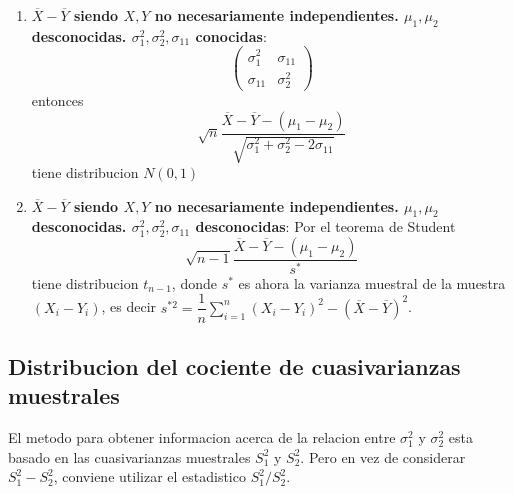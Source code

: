 \documentclass[10pt]{extarticle}
\newcommand{\<}{\langle}
\renewcommand{\>}{\rangle}
\theoremstyle{definition}
\begin{document}
\begin{enumerate}
        (Welch) Si los tamanos muestrales son muy pequenos $(n, m \leq 15)$:
        \begin{equation*}
          \dfrac{\overline{X}-\overline{Y} - (\mu_1-\mu_2)}{\sqrt{S_1^2/n + S_2^2/m}}
        \end{equation*}
        tiene aproximadamente distribucion $t_f$, siendo $f$ el numero de grados de libertad, esto es, el entero mas proximo a
        \begin{equation*}
          \dfrac{(S_1^2/n + S_2^2/m)^2}{\dfrac{1}{n+1} (S_1^2/n)^2 + \dfrac{1}{m+1}(S_2^2/m)^2} - 2
        \end{equation*}
  \item \textbf{$\overline{X}- \overline{Y}$ siendo $X, Y$ no necesariamente independientes. $\mu_1, \mu_2$ desconocidas. $\sigma_1^2, \sigma_2^2, \sigma_{11}$ conocidas}:
        \[    %
          \begin{pmatrix}
            \sigma_1^2  & \sigma_{11} \\
            \sigma_{11} & \sigma_2^2
          \end{pmatrix}
        \]    %
        entonces
        \begin{equation*}
          \sqrt{n} \dfrac{\overline{X}-\overline{Y} - (\mu_1-\mu_2)}{\sqrt{\sigma_1^2 + \sigma_2^2 - 2\sigma_{11}}}
        \end{equation*}
        tiene distribucion $N(0,1)$
  \item \textbf{$\overline{X}- \overline{Y}$ siendo $X, Y$ no necesariamente independientes. $\mu_1, \mu_2$ desconocidas. $\sigma_1^2, \sigma_2^2, \sigma_{11}$ desconocidas}:
        Por el teorema de Student
        \begin{equation*}
          \sqrt{n-1}\dfrac{\overline{X}-\overline{Y} - (\mu_1-\mu_2)}{s^*}
        \end{equation*}
        tiene distribucion $t_{n-1}$, donde $s^*$ es ahora la varianza muestral de la muestra $(X_i - Y_i)$, es decir $s^{*2}=\dfrac{1}{n}\sum_{i=1}^n(X_i-Y_i)^2 - (\overline{X} - \overline{Y})^2$.
\end{enumerate}

\subsection*{Distribucion del cociente de cuasivarianzas muestrales}

El metodo para obtener informacion acerca de la relacion entre $\sigma_1^2$ y $\sigma_2^2$ esta basado en las cuasivarianzas muestrales $S_1^2$ y $S_2^2$. Pero en vez de considerar $S_1^2 - S_2^2$, conviene utilizar el estadistico $S_1^2/S^2_2$.
\end{document}
